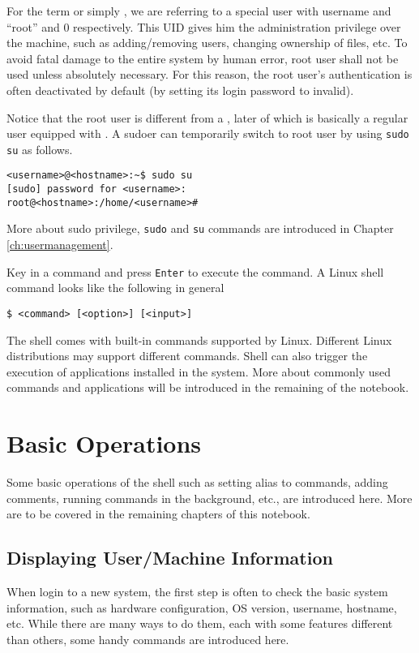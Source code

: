 {For the term  or simply , we are referring to a special user with username and  ``root'' and 0 respectively. This UID gives him the administration privilege over the machine, such as adding/removing users, changing ownership of files, etc. To avoid fatal damage to the entire system by human error, root user shall not be used unless absolutely necessary. For this reason, the root user's authentication is often deactivated by default (by setting its login password to invalid).

Notice that the root user is different from a , later of which is basically a regular user equipped with . A sudoer can temporarily switch to root user by using \verb|sudo su| as follows.
\begin{lstlisting}
<username>@<hostname>:~$ sudo su
[sudo] password for <username>:
root@<hostname>:/home/<username>#
\end{lstlisting}
More about sudo privilege, \verb|sudo| and \verb|su| commands are introduced in Chapter \ref{ch:usermanagement}.

Key in a command and press \verb|Enter| to execute the command. A Linux shell command looks like the following in general
\begin{lstlisting}
$ <command> [<option>] [<input>]
\end{lstlisting}

The shell comes with built-in commands supported by Linux. Different Linux distributions may support different commands. Shell can also trigger the execution of applications installed in the system. More about commonly used commands and applications will be introduced in the remaining of the notebook.

\section{Basic Operations}

Some basic operations of the shell such as setting alias to commands, adding comments, running commands in the background, etc., are introduced here. More are to be covered in the remaining chapters of this notebook.

\subsection{Displaying User/Machine Information}

When login to a new system, the first step is often to check the basic system information, such as hardware configuration, OS version, username, hostname, etc. While there are many ways to do them, each with some features different than others, some handy commands are introduced here.

}
